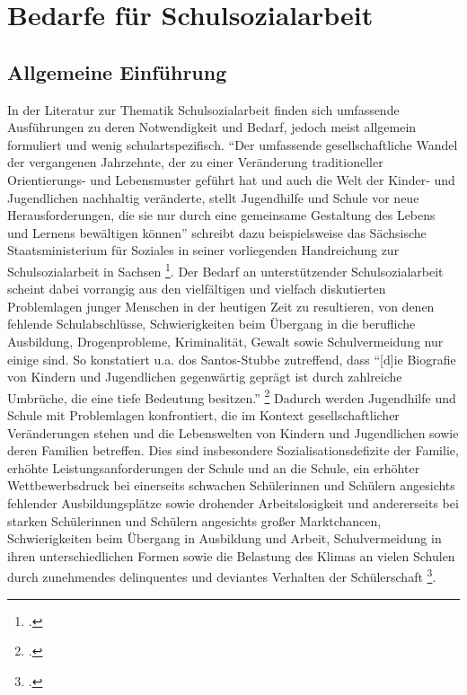 \section{Bedarfe für Schulsozialarbeit}
\label{sec:BedarfeFürSchulsozialarbeit}

\subsection{Allgemeine Einführung}
\label{sec:AllgemeineEinführung}

In der Literatur zur Thematik Schulsozialarbeit finden sich umfassende Ausführungen zu deren Notwendigkeit und Bedarf, jedoch meist allgemein formuliert und wenig schul\-art\-spe\-zifisch. "`Der umfassende gesellschaftliche Wandel der vergangenen Jahrzehnte, der zu einer Veränderung traditioneller Orientierungs- und Lebensmuster geführt hat und auch die Welt der Kinder- und Jugendlichen nachhaltig veränderte, stellt Jugendhilfe und Schule vor neue Herausforderungen, die sie nur durch eine gemeinsame Gestaltung des Lebens und Lernens bewältigen können"' schreibt dazu beispielsweise das Sächsische Staatsministerium für Soziales in seiner vorliegenden Handreichung zur Schulsozialarbeit in Sachsen \footcite[13]{SMSSS2009}. Der Bedarf an unterstützender Schulsozialarbeit scheint dabei vorrangig aus den vielfältigen und vielfach diskutierten Problemlagen junger Menschen in der heutigen Zeit zu resultieren, von denen fehlende Schulabschlüsse, Schwierigkeiten beim Übergang in die berufliche Ausbildung, Drogenprobleme, Kriminalität, Gewalt sowie Schulvermeidung nur einige sind. So konstatiert u.a. dos Santos-Stubbe zutreffend, dass "`[d]ie Biografie von Kindern und Jugendlichen gegenwärtig geprägt ist durch zahlreiche Umbrüche, die eine tiefe Bedeutung besitzen."' \footcite[68]{dosSantos-Stubbe2009} Dadurch werden Jugendhilfe und Schule mit Problemlagen konfrontiert, die im Kontext gesellschaftlicher Veränderungen stehen und die Lebenswelten von Kindern und Jugendlichen sowie deren Familien betreffen. Dies sind insbesondere Sozialisationsdefizite der Familie, erhöhte Leistungsanforderungen der Schule und an die Schule, ein erhöhter Wettbewerbsdruck bei einerseits schwachen Schülerinnen und Schülern angesichts fehlender Ausbildungsplätze sowie drohender Arbeitslosigkeit und andererseits bei starken Schülerinnen und Schülern angesichts großer Marktchancen, Schwierigkeiten beim Übergang in Ausbildung und Arbeit, Schulvermeidung in ihren unterschiedlichen Formen sowie die Belastung des Klimas an vielen Schulen durch zunehmendes delinquentes und deviantes Verhalten der Schülerschaft \footcite[vgl.][17]{SMSSS2009}.

